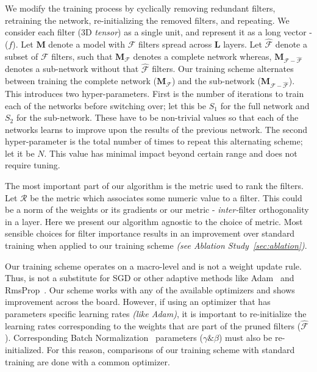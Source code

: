We modify the training process by cyclically removing redundant filters, retraining the network, re-initializing the removed filters, and repeating. 
We consider each filter ($3$D\textit{ tensor}) as a single unit, and represent it as a long vector - ($f$).
Let $\mathbf{M}$ denote a model with $\mathcal{F}$ filters spread across $\mathbf{L}$ layers. 
Let $\mathcal{\widehat{F}}$ denote a subset of $\mathcal{F}$ filters, such that $\mathbf{M}_\mathcal{F}$ denotes a complete network whereas, $\mathbf{M}_\mathcal{F-\widehat{F}}$ denotes a sub-network without that $\mathcal{\widehat{F}}$ filters.
Our training scheme alternates between training the complete network ($\mathbf{M}_\mathcal{F}$) and the sub-network ($\mathbf{M}_\mathcal{F-\widehat{F}}$).
This introduces two hyper-parameters.
First is the number of iterations to train each of the networks before switching over; let this be $S_1$ for the full network and $S_2$ for the sub-network. 
These have to be non-trivial values so that each of the networks learns to improve upon the results of the previous network.
The second hyper-parameter is the total number of times to repeat this alternating scheme; let it be $N$. 
This value has minimal impact beyond certain range and does not require tuning.


The most important part of our algorithm is the metric used to rank the filters. 
Let $\mathcal{R}$ be the metric which associates some numeric value to a filter. 
This could be a norm of the weights or its gradients or our metric - \textit{inter-}filter orthogonality in a layer.
Here we present our algorithm agnostic to the choice of metric. Most sensible choices for filter importance results in an improvement over standard training when applied to our training scheme \textit{(see Ablation Study~\ref{sec:ablation})}.


Our training scheme operates on a macro-level and is not a weight update rule.
Thus, is not a substitute for SGD or other adaptive methods like Adam~\cite{Kingma2014AdamAM} and RmsProp~\cite{Tieleman2012}. 
Our scheme works with any of the available optimizers and shows improvement across the board. %
However, if using an optimizer that has parameters specific learning rates \textit{(like Adam)}, it is important to re-initialize the learning rates corresponding to the weights
that are part of the pruned filters ($\mathcal{\widehat{F}}$).
Corresponding Batch Normalization~\cite{Ioffe2015BatchNA} parameters ($\gamma \& \beta$) must also be re-initialized.
For this reason, comparisons of our training scheme with standard training are done with a common optimizer.

